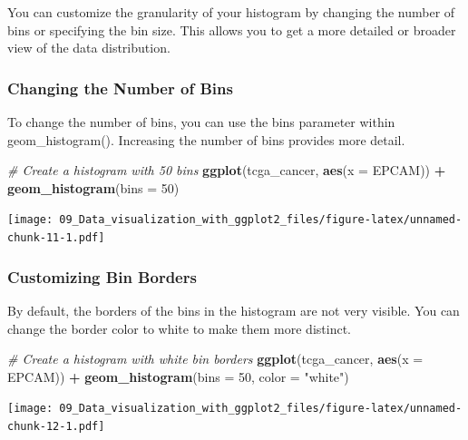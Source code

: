 \documentclass[
]{book}
\newenvironment{Shaded}{\begin{snugshade}}{\end{snugshade}}
\newcommand{\AttributeTok}[1]{\textcolor[rgb]{0.13,0.29,0.53}{#1}}
\newcommand{\CommentTok}[1]{\textcolor[rgb]{0.56,0.35,0.01}{\textit{#1}}}
\newcommand{\DecValTok}[1]{\textcolor[rgb]{0.00,0.00,0.81}{#1}}
\newcommand{\FunctionTok}[1]{\textcolor[rgb]{0.13,0.29,0.53}{\textbf{#1}}}
\newcommand{\NormalTok}[1]{#1}
\newcommand{\SpecialCharTok}[1]{\textcolor[rgb]{0.81,0.36,0.00}{\textbf{#1}}}
\newcommand{\StringTok}[1]{\textcolor[rgb]{0.31,0.60,0.02}{#1}}
\begin{document}
You can customize the granularity of your histogram by changing the number of bins or specifying the bin size. This allows you to get a more detailed or broader view of the data distribution.

\hypertarget{changing-the-number-of-bins}{%
\subsubsection{Changing the Number of Bins}\label{changing-the-number-of-bins}}

To change the number of bins, you can use the bins parameter within geom\_histogram(). Increasing the number of bins provides more detail.

\begin{Shaded}
\begin{Highlighting}[]
\CommentTok{\# Create a histogram with 50 bins}
\FunctionTok{ggplot}\NormalTok{(tcga\_cancer, }\FunctionTok{aes}\NormalTok{(}\AttributeTok{x =}\NormalTok{ EPCAM)) }\SpecialCharTok{+}
  \FunctionTok{geom\_histogram}\NormalTok{(}\AttributeTok{bins =} \DecValTok{50}\NormalTok{)}
\end{Highlighting}
\end{Shaded}

\texttt{[image: 09\_Data\_visualization\_with\_ggplot2\_files/figure-latex/unnamed-chunk-11-1.pdf]}

\hypertarget{customizing-bin-borders}{%
\subsubsection{Customizing Bin Borders}\label{customizing-bin-borders}}

By default, the borders of the bins in the histogram are not very visible. You can change the border color to white to make them more distinct.

\begin{Shaded}
\begin{Highlighting}[]
\CommentTok{\# Create a histogram with white bin borders}
\FunctionTok{ggplot}\NormalTok{(tcga\_cancer, }\FunctionTok{aes}\NormalTok{(}\AttributeTok{x =}\NormalTok{ EPCAM)) }\SpecialCharTok{+}
  \FunctionTok{geom\_histogram}\NormalTok{(}\AttributeTok{bins =} \DecValTok{50}\NormalTok{, }\AttributeTok{color =} \StringTok{"white"}\NormalTok{)}
\end{Highlighting}
\end{Shaded}

\texttt{[image: 09\_Data\_visualization\_with\_ggplot2\_files/figure-latex/unnamed-chunk-12-1.pdf]}
\end{document}
